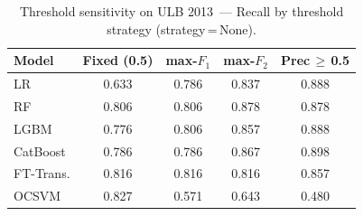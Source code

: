 \begin{table}[H]
\centering
\caption{Threshold sensitivity on ULB 2013~--- Recall by threshold strategy (strategy\,=\,None).}
\label{tab:threshold_ulb_recall}
\begin{tabular}{l c c c c}
\toprule
Model & Fixed (0.5) & max-$F_1$ & max-$F_2$ & Prec\,$\geq$\,0.5 \\
\midrule
LR         & 0.633 & 0.786 & 0.837 & 0.888 \\
RF         & 0.806 & 0.806 & 0.878 & 0.878 \\
LGBM       & 0.776 & 0.806 & 0.857 & 0.888 \\
CatBoost   & 0.786 & 0.786 & 0.867 & 0.898 \\
FT-Trans.  & 0.816 & 0.816 & 0.816 & 0.857 \\
OCSVM      & 0.827 & 0.571 & 0.643 & 0.480 \\
\bottomrule
\end{tabular}
\end{table}